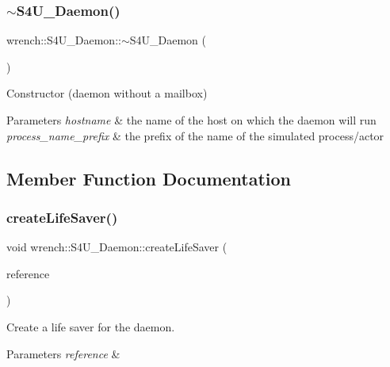 \subsubsection{\texorpdfstring{$\sim$\+S4\+U\+\_\+\+Daemon()}{~S4U\_Daemon()}}
{\footnotesize\ttfamily wrench\+::\+S4\+U\+\_\+\+Daemon\+::$\sim$\+S4\+U\+\_\+\+Daemon (\begin{DoxyParamCaption}{ }\end{DoxyParamCaption})\hspace{0.3cm}{\ttfamily [virtual]}}



Constructor (daemon without a mailbox) 


\begin{DoxyParams}{Parameters}
{\em hostname} & the name of the host on which the daemon will run \\
\hline
{\em process\+\_\+name\+\_\+prefix} & the prefix of the name of the simulated process/actor \\
\hline
\end{DoxyParams}


\subsection{Member Function Documentation}
\mbox{\label{classwrench_1_1_s4_u___daemon_a591abd15d6a27371cb04b7839862cc1b}} 
\subsubsection{\texorpdfstring{create\+Life\+Saver()}{createLifeSaver()}}
{\footnotesize\ttfamily void wrench\+::\+S4\+U\+\_\+\+Daemon\+::create\+Life\+Saver (\begin{DoxyParamCaption}\item[{std\+::shared\+\_\+ptr$<$ \hyperlink{classwrench_1_1_s4_u___daemon}{S4\+U\+\_\+\+Daemon} $>$}]{reference }\end{DoxyParamCaption})}



Create a life saver for the daemon. 


\begin{DoxyParams}{Parameters}
{\em reference} & \\
\hline
\end{DoxyParams}
\mbox{\label{classwrench_1_1_s4_u___daemon_a29626b03bc3ef2483366d3f032e6585d}} 
